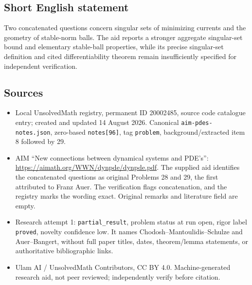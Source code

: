 \documentclass[11pt]{article}
\begin{document}
\subsection{Short English statement}
Two concatenated questions concern singular sets of minimizing currents and the geometry of stable-norm balls. The aid reports a stronger aggregate singular-set bound and elementary stable-ball properties, while its precise singular-set definition and cited differentiability theorem remain insufficiently specified for independent verification.
\subsection{Sources}
\begin{itemize}
\item Local UnsolvedMath registry, permanent ID 20002485, source code catalogue entry; created and updated 14 August 2026. Canonical \texttt{aim-pdes-notes.json}, zero-based \texttt{notes[96]}, tag \texttt{problem}, background/extracted item 8 followed by 29.
\item AIM ``New connections between dynamical systems and PDE's'': \url{https://aimath.org/WWN/dynpde/dynpde.pdf}. The supplied aid identifies the concatenated questions as original Problems 28 and 29, the first attributed to Franz Auer. The verification flags concatenation, and the registry marks the wording exact. Original remarks and literature field are empty.
\item Research attempt 1: \texttt{partial\_result}, problem status at run open, rigor label \texttt{proved}, novelty confidence low. It names Chodosh--Mantoulidis--Schulze and Auer--Bangert, without full paper titles, dates, theorem/lemma statements, or authoritative bibliographic links.
\item Ulam AI / UnsolvedMath Contributors, CC BY 4.0. Machine-generated research aid, not peer reviewed; independently verify before citation.
\end{itemize}
\end{document}
